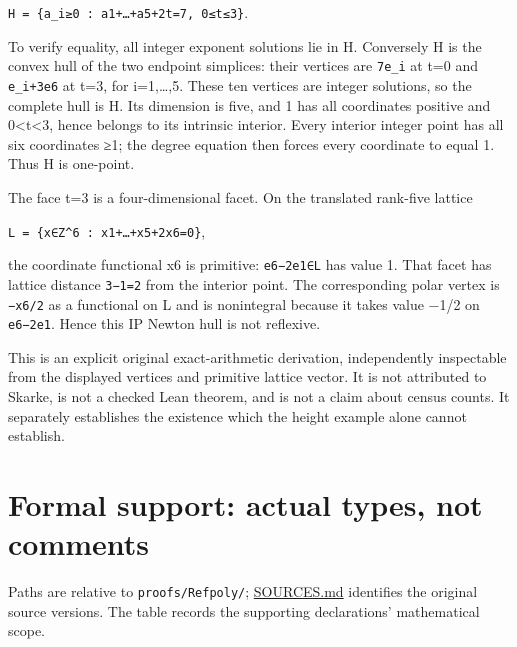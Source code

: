 \documentclass[11pt,a4paper,oneside]{report}
\begin{document}
\texttt{H =\allowbreak{} \{a\_\allowbreak{}i≥0 :\allowbreak{} a1+…+a5+2t=\allowbreak{}7,\allowbreak{} 0≤t≤3\}}.

To verify equality, all integer exponent solutions lie in H. Conversely
H is the convex hull of the two endpoint simplices: their vertices are
\texttt{7e\_\allowbreak{}i} at t=0 and \texttt{e\_\allowbreak{}i+3e6} at
t=3, for i=1,\ldots,5. These ten vertices are integer solutions, so the
complete hull is H. Its dimension is five, and 1 has all coordinates
positive and 0\textless t\textless3, hence belongs to its intrinsic
interior. Every interior integer point has all six coordinates ≥1; the
degree equation then forces every coordinate to equal 1. Thus H is
one-point.

The face t=3 is a four-dimensional facet. On the translated rank-five
lattice

\texttt{L =\allowbreak{} \{x∈Z\textasciicircum{}6 :\allowbreak{} x1+…+x5+2x6=\allowbreak{}0\}},

the coordinate functional x6 is primitive: \texttt{e6−2e1∈L} has value
1. That facet has lattice distance \texttt{3−1=\allowbreak{}2} from the
interior point. The corresponding polar vertex is
\texttt{−x6/\allowbreak{}2} as a functional on L and is nonintegral
because it takes value −1/2 on \texttt{e6−2e1}. Hence this IP Newton
hull is not reflexive.

This is an explicit original exact-arithmetic derivation, independently
inspectable from the displayed vertices and primitive lattice vector. It
is not attributed to Skarke, is not a checked Lean theorem, and is not a
claim about census counts. It separately establishes the existence which
the height example alone cannot establish.

\section{Formal support: actual types, not
comments}\label{ip-reflexivity-and-pyramids--formal-support-actual-types-not-comments}

Paths are relative to \texttt{proofs/\allowbreak{}Refpoly/};
\href{../../proofs/SOURCES.md}{SOURCES.md} identifies the original
source versions. The table records the supporting declarations'
mathematical scope.
\end{document}
